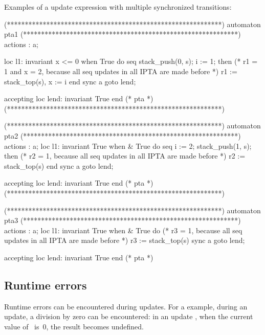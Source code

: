 Examples of a  update expression with multiple synchronized transitions:

\begin{IMITATORmodel}
(************************************************************)
automaton pta1
(************************************************************)
	actions : a;

	loc l1: invariant x <= 0
	when True
	do {
		seq
			stack_push(0, s);
			i := 1;
		then
			(* r1 = 1 and x = 2, because all seq updates in all IPTA are made before *)
			r1 := stack_top(s),
			x := i
		end
	}
	sync a goto lend;

	accepting loc lend: invariant True
	end (* pta *)
	(************************************************************)

	(************************************************************)
	automaton pta2
	(************************************************************)
	actions : a;
	loc l1: invariant True
	when
	& True
	do {
		seq
			i := 2;
			stack_push(1, s);
		then
			(* r2 = 1, because all seq updates in all IPTA are made before *)
			r2 := stack_top(s)
		end
	}
	sync a goto lend;

	accepting loc lend: invariant True
	end (* pta *)
	(************************************************************)

	(************************************************************)
	automaton pta3
	(************************************************************)
	actions : a;
	loc l1: invariant True
	when
	& True
	do {
		(* r3 = 1, because all seq updates in all IPTA are made before *)
		r3 := stack_top(s)
	}
	sync a goto lend;

	accepting loc lend: invariant True
	end (* pta *)
\end{IMITATORmodel}


\subsection{Runtime errors}\label{ss:runtime-errors}

Runtime errors can be encountered during updates.
For a example, during an update, a division by zero can be encountered: in an update , when the current value of~ is~0, the result becomes undefined.


